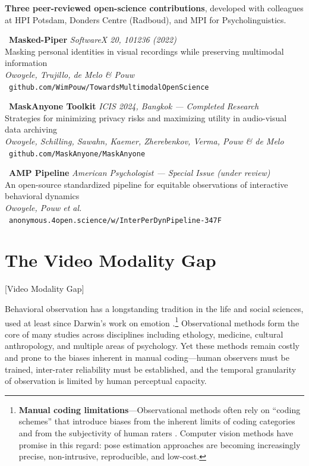 \documentclass[../main.tex]{subfiles}
\begin{document}
\begin{replicationbox}
\textbf{Three peer-reviewed open-science contributions}, developed with colleagues at HPI Potsdam, Donders Centre (Radboud), and MPI for Psycholinguistics.

\medskip
\faLaptopCode\ \textbf{Masked-Piper} \hfill \textit{SoftwareX 20, 101236 (2022)}\\
Masking personal identities in visual recordings while preserving multimodal information\\
\textit{Owoyele, Trujillo, de Melo \& Pouw} \parencite{owoyele2022maskedpiper}\\
\faGithub\ \texttt{github.com/WimPouw/TowardsMultimodalOpenScience}

\medskip
\faLaptopCode\ \textbf{MaskAnyone Toolkit} \hfill \textit{ICIS 2024, Bangkok --- Completed Research}\\
Strategies for minimizing privacy risks and maximizing utility in audio-visual data archiving\\
\textit{Owoyele, Schilling, Sawahn, Kaemer, Zherebenkov, Verma, Pouw \& de Melo} \parencite{owoyele2024maskanyone}\\
\faGithub\ \texttt{github.com/MaskAnyone/MaskAnyone}

\medskip
\faLaptopCode\ \textbf{AMP Pipeline} \hfill \textit{American Psychologist --- Special Issue (under review)}\\
An open-source standardized pipeline for equitable observations of interactive behavioral dynamics\\
\textit{Owoyele, Pouw et al.} \parencite{owoyele2025amppipeline}\\
\faCode\ \texttt{anonymous.4open.science/w/InterPerDynPipeline-347F}
\end{replicationbox}


\section{The Video Modality Gap}[Video Modality Gap]

Behavioral observation has a longstanding tradition in the life and social sciences, used at least since Darwin's work on emotion \parencite{darwin1872expression}.\footnote{\textbf{Manual coding limitations}---Observational methods often rely on ``coding schemes'' that introduce biases from the inherent limits of coding categories and from the subjectivity of human raters \parencite{owoyele2025amppipeline}. Computer vision methods have promise in this regard: pose estimation approaches are becoming increasingly precise, non-intrusive, reproducible, and low-cost.} Observational methods form the core of many studies across disciplines including ethology, medicine, cultural anthropology, and multiple areas of psychology. Yet these methods remain costly and prone to the biases inherent in manual coding---human observers must be trained, inter-rater reliability must be established, and the temporal granularity of observation is limited by human perceptual capacity.
\end{document}
